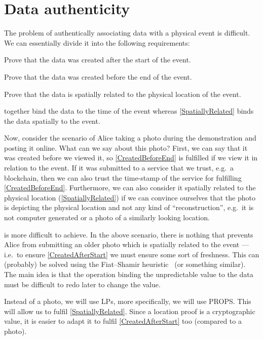 \section{Data authenticity}
\label{DataAuthenticity}

The problem of authentically associating data with a physical event is 
difficult.
We can essentially divide it into the following requirements:
\begin{requirements}[A]
  \item\label{CreatedAfterStart} Prove that the data was created after the 
    start of the event.
  \item\label{CreatedBeforeEnd} Prove that the data was created before the end 
    of the event.
  \item\label{SpatiallyRelated} Prove that the data is spatially related to the 
    physical location of the event.
\end{requirements} %
 together bind the data to the time of 
the event whereas \cref{SpatiallyRelated} binds the data spatially to the 
event.

Now, consider the scenario of Alice taking a photo during the demonstration and 
posting it online.
What can we say about this photo?
First, we can say that it was created before we viewed it, so 
\cref{CreatedBeforeEnd} is fulfilled if we view it in relation to the event.
If it was submitted to a service that we trust, e.g.\ a blockchain, then we can 
also trust the time-stamp of the service for fulfilling 
\cref{CreatedBeforeEnd}.
Furthermore, we can also consider it spatially related to the physical location
(\cref{SpatiallyRelated}) if we can convince ourselves that the photo is 
depicting the physical location and not any kind of \enquote{reconstruction}, 
e.g.\ it is not computer generated or a photo of a similarly looking location.

 is more difficult to achieve.
In the above scenario, there is nothing that prevents Alice from submitting an 
older photo which is spatially related to the event --- i.e.\ to ensure 
\cref{CreatedAfterStart} we must ensure some sort of freshness.
This can (probably) be solved using the Fiat--Shamir 
heuristic~\cite{FiatShamirHeuristic} (or something similar).
The main idea is that the operation binding the unpredictable value to the data 
must be difficult to redo later to change the value.

Instead of a photo, we will use \acp{LP}, more specifically, we will use 
\ac{PROPS}.
This will allow us to fulfil \cref{SpatiallyRelated}.
Since a location proof is a cryptographic value, it is easier to adapt it to 
fulfil \cref{CreatedAfterStart} too (compared to a photo).
